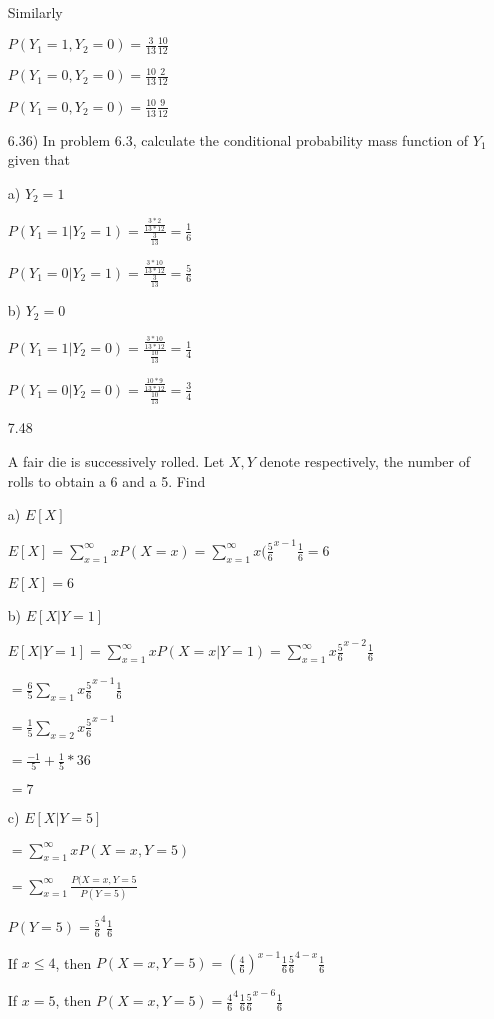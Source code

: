 \documentclass[11pt]{article}
\begin{document}
\begin{itemize}
		Similarly

		$P(Y_1 = 1, Y_2 = 0) = \frac{3}{13} \frac{10}{12}$

		$P(Y_1 = 0, Y_2 = 0) = \frac{10}{13} \frac{2}{12}$

		$P(Y_1 = 0, Y_2 = 0) = \frac{10}{13} \frac{9}{12}$

		6.36) In problem 6.3, calculate the conditional probability mass function of $Y_1$ given that 
		
		a) $Y_2 = 1$

		$P(Y_1 = 1 | Y_2 = 1) = \frac{\frac{3*2}{13*12}}{\frac{3}{13}} = \frac{1}{6}$

		$P(Y_1 = 0 | Y_2 = 1) = \frac{\frac{3*10}{13*12}}{\frac{3}{13}} = \frac{5}{6}$

		b) $Y_2 = 0$

		$P(Y_1 = 1| Y_2 = 0) = \frac{\frac{3*10}{13*12}}{\frac{10}{13}} = \frac{1}{4}$

		$P(Y_1 = 0 | Y_2 = 0) = \frac{\frac{10*9}{13*12}}{\frac{10}{13}} = \frac{3}{4}$

	\item[7.48]

		A fair die is successively rolled. Let $X,Y$ denote respectively, the number of rolls to obtain a 6 and a 5. Find

		a) $E[X]$

		$E[X] = \sum_{x=1}^{\infty} xP(X=x) = \sum_{x=1}^{\infty} x(\frac{5}{6}^{x-1} \frac{1}{6} = 6$

		$E[X] = 6$

		b) $E[X|Y = 1]$

		$E[X|Y = 1] = \sum_{x=1}^{\infty} xP(X=x | Y = 1) = \sum_{x=1}^{\infty} x\frac{5}{6}^{x-2} \frac{1}{6}$

		$=\frac{6}{5} \sum_{x=1} x\frac{5}{6}^{x-1} \frac{1}{6}$

		$=\frac{1}{5} \sum_{x=2} x\frac{5}{6}^{x-1}$

		$=\frac{-1}{5} + \frac{1}{5}*36$

		$=7$

		c) $E[X|Y = 5]$

		$=\sum_{x=1}^{\infty} xP(X = x, Y = 5)$

		$=\sum_{x=1}^{\infty} \frac{P(X = x, Y=5}{P(Y = 5)}$

		$P(Y = 5) = \frac{5}{6}^4 \frac{1}{6}$

		If $x \leq 4$, then $P(X = x, Y= 5) = (\frac{4}{6})^{x-1}\frac{1}{6} \frac{5}{6}^{4-x} \frac{1}{6}$

		If $x = 5$, then $P(X = x, Y =5) = \frac{4}{6}^{4} \frac{1}{6} \frac{5}{6}^{x-6} \frac{1}{6}$


\end{itemize}
\end{document}
